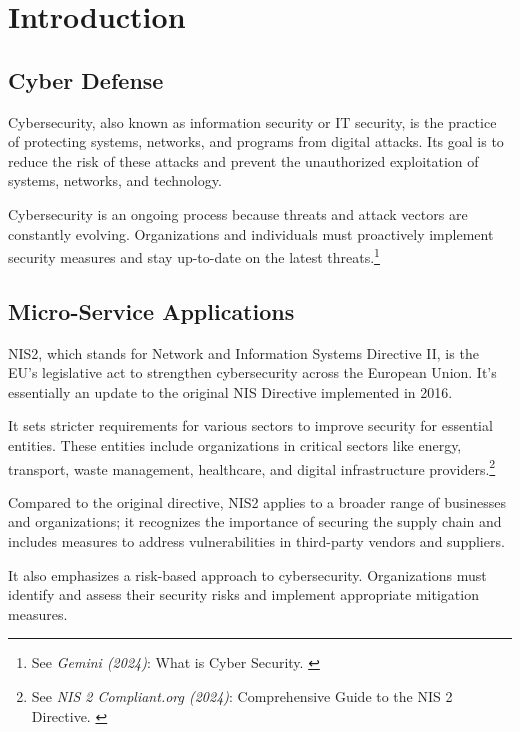 %
%

\pagebreak
\section{Introduction}

\onehalfspacing

\subsection{Cyber Defense}

Cybersecurity, also known as information security or IT security, is the practice of protecting systems, networks, and programs from digital attacks. Its goal is to reduce the risk of these attacks and prevent the unauthorized exploitation of systems, networks, and technology.

Cybersecurity is an ongoing process because threats and attack vectors are constantly evolving. Organizations and individuals must proactively implement security measures and stay up-to-date on the latest threats.\footnote{See \textit{Gemini (2024)}: What is Cyber Security. \cite{bardCybersec}}

\subsection{Micro-Service Applications}

NIS2, which stands for Network and Information Systems Directive II, is the EU's legislative act to strengthen cybersecurity across the European Union. It's essentially an update to the original NIS Directive implemented in 2016.

It sets stricter requirements for various sectors to improve security for essential entities. These entities include organizations in critical sectors like energy, transport, waste management, healthcare, and digital infrastructure providers.\footnote{See \textit{NIS 2 Compliant.org (2024)}: Comprehensive Guide to the NIS 2 Directive. \cite{nisGuide}}

Compared to the original directive, NIS2 applies to a broader range of businesses and organizations; it recognizes the importance of securing the supply chain and includes measures to address vulnerabilities in third-party vendors and suppliers.

It also emphasizes a risk-based approach to cybersecurity. Organizations must identify and assess their security risks and implement appropriate mitigation measures.


